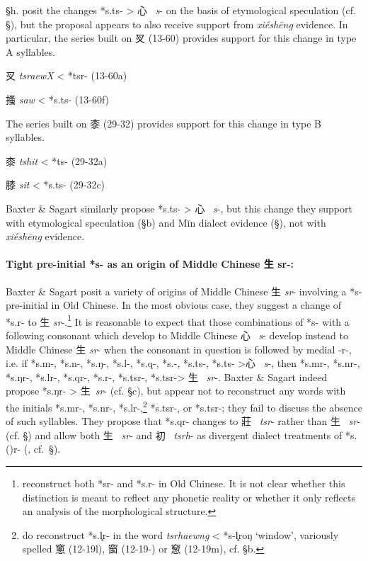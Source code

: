 §h. \citet[136]{Baxter2014OldChinese}
posit the changes *s.ts- \textgreater{}
心~ \emph{s}- on the basis of etymological speculation (cf. §), but the
proposal appears to also receive support from  \emph{xiéshēng} evidence.
In particular, the series built on 㕚 (13-60) provides support for this
change in type A syllables.

\begin{description} \item
㕚  \emph{tsraewX} \textless{} *ts{}r- (13-60a)
\item
搔  \emph{saw} \textless{} *s.ts{}- (13-60f)
\end{description}

The series built on 桼 (29-32) provides support for this change in type
B syllables.

\begin{description} \item
桼  \emph{tshit} \textless{} *ts{}- (29-32a)
 \item
膝  \emph{sit} \textless{} *s.ts- (29-32c)
\end{description}

Baxter \& Sagart similarly propose *s.ts{}- \textgreater{} 心~ \emph{s}-,
but this change they support with etymological speculation (§b) and Mĭn
dialect evidence (§), not with  \emph{xiéshēng} evidence.

\paragraph{Tight pre-initial *s- as
an origin of Middle Chinese 生 {\textbf{sr-}}\textbf{:}}
Baxter \& Sagart posit a variety of origins of Middle Chinese 生
 \emph{sr}- involving a *s- pre-initial in Old Chinese. In the most
obvious case, they suggest a change of *s.r- to 生 \emph{sr}-.\footnote{\citet[]{Baxter2014OldChinese} reconstruct both *sr- and *s.r- in Old Chinese. It is
  not clear whether this distinction is meant to reflect any phonetic
  reality or whether it only reflects an analysis of the morphological
  structure.} It is reasonable to expect that those combinations of *s-
with a following consonant which develop to Middle Chinese 心~ \emph{s}-
develop instead to Middle Chinese 生 \emph{sr}- when the consonant in
question is followed by medial -r-, i.e. if *s.m-, *s.n-, *s.ŋ-, *s.l-,
*s.q-, *s.{}-, *s.ts-, *s.ts{}- \textgreater{}心~ \emph{s}-, then *s.mr-,
*s.nr-, *s.ŋr-, *s.lr-, *s.qr-, *s.{}r-, *s.tsr-, *s.ts{}r-\textgreater{}
生~ \emph{sr}-. Baxter \& Sagart indeed propose *s.ŋr- \textgreater{}
生~\emph{sr}- (cf. §c), but appear not to reconstruct any words with the
initials *s.mr-, *s.nr-, *s.lr-,\footnote{\citet[150]{Baxter2014OldChinese} do reconstruct *s.l̥{}r- in the word  \emph{tsrhaewng} \textless{}
  *s‑l̥{}roŋ `window', variously spelled 窻 (12-19l), 窗 (12-19-) or 䆫
  (12-19m), cf. §b.} *s.tsr-, or *s.ts{}r-; they fail to discuss the
absence of such syllables. They propose that *s.qr- changes to
莊~ \emph{tsr}- rather than 生~ \emph{sr}- (cf. §) and allow both
生~ \emph{sr}- and 初~ \emph{tsrh}- as divergent dialect treatments of
*s.{}({})r- 
(\cite[140]{Baxter2014OldChinese}, cf.~§).


